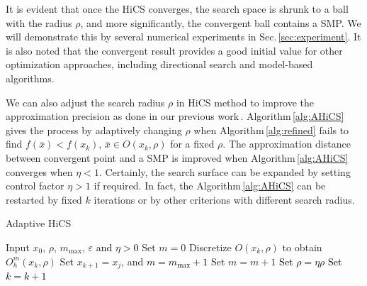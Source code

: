 It is evident that once the HiCS converges,
the search space is shrunk to a ball with the radius $\rho$, and
more significantly, the convergent ball contains a SMP.
We will demonstrate this by several numerical experiments in
Sec.\,\ref{sec:experiment}.
It is also noted that the convergent result provides a
good initial value for other optimization approaches, including 
directional search and model-based algorithms.

We can also adjust the search radius $\rho$ in HiCS method 
to improve the approximation precision as done in our previous
work\,\cite{huang2017hill}. Algorithm\,\ref{alg:AHiCS} gives the
process by adaptively changing $\rho$ when Algorithm\,\ref{alg:refined} fails
to find $f(\bar{x})<f(x_k)$, $\bar{x}\in O(x_k, \rho)$ for a fixed $\rho$.
The approximation distance between convergent point and a SMP is
improved when Algorithm\,\ref{alg:AHiCS} converges when $\eta <1$.
Certainly, the search surface can be expanded by setting
control factor $\eta>1$ if required. 
In fact, the Algorithm\,\ref{alg:AHiCS} can be restarted by
fixed $k$ iterations or by other criterions
with different search radius.

%
%
\begin{algorithm}[H]
	\caption{Adaptive HiCS}
	\label{alg:AHiCS}
\begin{algorithmic}[1]
	\STATE Input $x_0$, $\rho$, $m_{\max}$,
	\textcolor{black}{$\varepsilon$ and $\eta>0$}
	\IF { \textcolor{black}{ $\rho>\varepsilon$}}
		\STATE Set $m=0$
			\STATE Discretize $O(x_k,\rho)$ to obtain $O^m_h(x_k,\rho)$
			\STATE Set $x_{k+1}=x_j$, 
				and \textcolor{black}{$m=m_{\max}+1$} 
			\ELSE
				\STATE Set $m = m+1$
			\ENDIF
		\ELSE
			\STATE \textcolor{black}{ Set $\rho=\eta\rho$}
		\ENDIF
		\STATE \textcolor{black}{Set $k=k+1$}
	\ENDFOR
\ENDIF
\end{algorithmic}
\end{algorithm}


